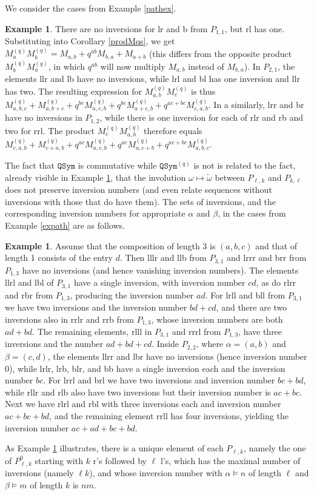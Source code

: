 \documentclass{article}
\theoremstyle{definition}
\newtheorem{ex}[thm]{Example}
\begin{document}
We consider the cases from Example \ref{pathex}.
\begin{ex}
There are no inversions for lr and b from $P_{1,1}$, but rl has one. Substituting into Corollary \ref{prodMqs}, we get $M_{a}^{(q)}M_{b}^{(q)}=M_{a,b}+q^{ab}M_{b,a}+M_{a+b}$ (this differs from the opposite product $M_{b}^{(q)}M_{a}^{(q)}$, in which $q^{ab}$ will now multiply $M_{a,b}$ instead of $M_{b,a}$). In $P_{2,1}$, the elements llr and lb have no inversions, while lrl and bl has one inversion and llr has two. The resulting expression for $M_{a,b}^{(q)}M_{c}^{(q)}$ is thus $M_{a,b,c}^{(q)}+M_{a,b+c}^{(q)}+q^{bc}M_{a,c,b}^{(q)}+q^{bc}M_{a+c,b}^{(q)}+q^{ac+bc}M_{c,a,b}^{(q)}$. In a similarly, lrr and br have no inversions in $P_{1,2}$, while there is one inversion for each of rlr and rb and two for rrl. The product $M_{c}^{(q)}M_{a,b}^{(q)}$ therefore  equals $M_{c,a,b}^{(q)}+M_{c+a,b}^{(q)}+q^{ac}M_{a,c,b}^{(q)}+q^{ac}M_{a,c+b}^{(q)}+q^{ac+bc}M_{a,b,c}^{(q)}$. \label{pathexq}
\end{ex}
The fact that $\mathtt{QSym}$ is commutative while $\mathtt{QSym}^{(q)}$ is not is related to the fact, already visible in Example \ref{pathexq}, that the involution $\omega\mapsto\tilde{\omega}$ between $P_{\ell,k}$ and $P_{k,\ell}$ does not preserve inversion numbers (and even relate sequences without inversions with those that do have them). The sets of inversions, and the corresponding inversion numbers for appropriate $\alpha$ and $\beta$, in the cases from Example \ref{expath} are as follows.
\begin{ex}
Assume that the composition of length 3 is $(a,b,c)$ and that of length 1 consists of the entry $d$. Then lllr and llb from $P_{3,1}$ and lrrr and brr from $P_{1,3}$ have no inversions (and hence vanishing inversion numbers). The elements llrl and lbl of $P_{3,1}$ have a single inversion, with inversion number $cd$, as do rlrr and rbr from $P_{1,3}$, producing the inversion number $ad$. For lrll and bll from $P_{3,1}$ we have two inversions and the inversion number $bd+cd$, and there are two inversions also in rrlr and rrb from $P_{1,3}$, whose inversion numbers are both $ad+bd$. The remaining elements, rlll in $P_{3,1}$ and rrrl from $P_{1,3}$, have three inversions and the number $ad+bd+cd$. Inside $P_{2,2}$, where $\alpha=(a,b)$ and $\beta=(c,d)$, the elements llrr and lbr have no inversions (hence inversion number 0), while lrlr, lrb, blr, and bb have a single inversion each and the inversion number $bc$. For lrrl and brl we have two inversions and inversion number $bc+bd$, while rllr and rlb also have two inversions but their inversion number is $ac+bc$. Next we have rlrl and rbl with three inversions each and inversion number $ac+bc+bd$, and the remaining element rrll has four inversions, yielding the inversion number $ac+ad+bc+bd$. \label{expathq}
\end{ex}
As Example \ref{expathq} illustrates, there is a unique element of each $P_{\ell,k}$, namely the one of $P_{\ell,k}^{0}$ starting with $k$ r's followed by $\ell$ l's, which has the maximal number of inversions (namely $\ell k$), and whose inversion number with $\alpha \vDash n$ of length $\ell$ and $\beta \vDash m$ of length $k$ is $nm$.
\end{document}

